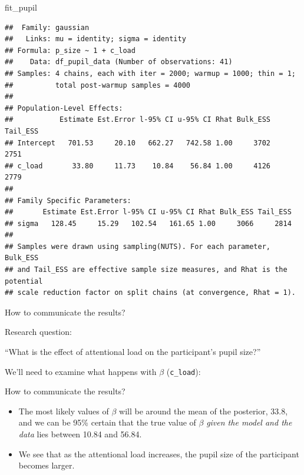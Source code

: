 \documentclass[12pt,ignorenonframetext,aspectratio=169]{beamer}
\newenvironment{Shaded}{\begin{snugshade}}{\end{snugshade}}
\newcommand{\NormalTok}[1]{#1}
\providecommand{\tightlist}{%
  \setlength{\itemsep}{0pt}\setlength{\parskip}{0pt}}
\begin{document}
\begin{frame}[fragile]

\scriptsize

\begin{Shaded}
\begin{Highlighting}[]
\NormalTok{fit_pupil}
\end{Highlighting}
\end{Shaded}

\begin{verbatim}
##  Family: gaussian 
##   Links: mu = identity; sigma = identity 
## Formula: p_size ~ 1 + c_load 
##    Data: df_pupil_data (Number of observations: 41) 
## Samples: 4 chains, each with iter = 2000; warmup = 1000; thin = 1;
##          total post-warmup samples = 4000
## 
## Population-Level Effects: 
##           Estimate Est.Error l-95% CI u-95% CI Rhat Bulk_ESS Tail_ESS
## Intercept   701.53     20.10   662.27   742.58 1.00     3702     2751
## c_load       33.80     11.73    10.84    56.84 1.00     4126     2779
## 
## Family Specific Parameters: 
##       Estimate Est.Error l-95% CI u-95% CI Rhat Bulk_ESS Tail_ESS
## sigma   128.45     15.29   102.54   161.65 1.00     3066     2814
## 
## Samples were drawn using sampling(NUTS). For each parameter, Bulk_ESS
## and Tail_ESS are effective sample size measures, and Rhat is the potential
## scale reduction factor on split chains (at convergence, Rhat = 1).
\end{verbatim}

\normalsize

\end{frame}

\begin{frame}[fragile]{How to communicate the results?}
\protect\hypertarget{how-to-communicate-the-results}{}

\small

\normalsize

\begin{block}{Research question:}

``What is the effect of attentional load on the participant's pupil size?''

We'll need to examine what happens with \(\beta\) (\texttt{c\_load}):

\end{block}

\end{frame}

\begin{frame}{How to communicate the results?}
\protect\hypertarget{how-to-communicate-the-results-1}{}

\begin{itemize}
\tightlist
\item
  The most likely values of \(\beta\) will be around the mean of the posterior, 33.8, and we can be 95\% certain that the true value of \(\beta\) \emph{given the model and the data} lies between 10.84 and 56.84.
\item
  We see that as the attentional load increases, the pupil size of the participant becomes larger.
\end{itemize}

\end{frame}
\end{document}
